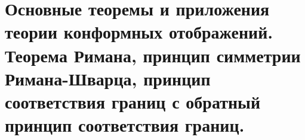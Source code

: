 \newpage
\section{Основные теоремы и приложения теории конформных отображений. Теорема Римана, принцип симметрии Римана-Шварца, принцип соответствия границ с обратный принцип соответствия границ.}

